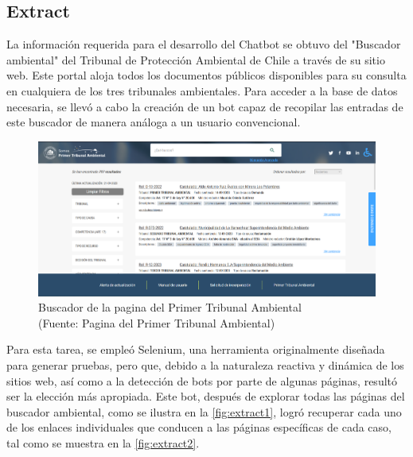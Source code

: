 \subsection{Extract}


La información requerida para el desarrollo del Chatbot se obtuvo del "Buscador ambiental" del Tribunal de Protección Ambiental 
de Chile a través de su sitio web\cite{BuscadorAmbiental}. Este portal aloja todos los documentos públicos disponibles para su consulta en cualquiera 
de los tres tribunales ambientales. Para acceder a la base de datos necesaria, se llevó a cabo la creación de 
un bot capaz de recopilar las entradas de este buscador de manera análoga a un usuario convencional.

\begin{figure}[ht!]
    \centering
    \includegraphics[width=.8\textwidth]{figures/huemul2.png}
    \caption[Screenshot del Buscador de la pagina del Primer Tribunal Ambiental]{Buscador de la pagina del Primer Tribunal Ambiental\\
    {\scriptsize (Fuente: Pagina del Primer Tribunal Ambiental)}}
    \label{fig:extract1}
\end{figure}
    
Para esta tarea, se empleó Selenium, una herramienta originalmente diseñada para generar pruebas, pero que, debido a la naturaleza 
reactiva y dinámica de los sitios web, así como a la detección de bots por parte de algunas páginas, resultó ser la elección 
más apropiada. Este bot, después de explorar todas las páginas del buscador ambiental, como se ilustra en la \autoref{fig:extract1},
logró recuperar cada uno de los enlaces individuales que conducen a las páginas específicas de cada caso, tal como se 
muestra en la \autoref{fig:extract2}.

